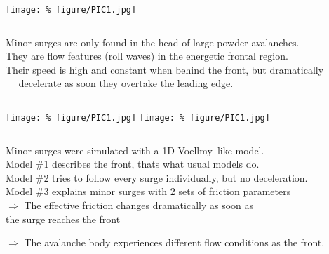 \documentclass[unknownkeysallowed,usepdftitle=false]{beamer}
\newcommand{\secvariable}{nothing}
\newcommand{\mysection}[1]{\renewcommand{\secvariable}{#1}
}
\begin{document}
\mysection{minor}
\begin{frame}\label{\secvariable} %
\begin{center}
\texttt{[image: \%
figure/PIC1.jpg]}
\end{center}
\vspace{-0.2cm}
\begin{columns}
\begin{column}[t]{1.1\textwidth}
Minor surges are only found in the head of large powder avalanches.\\
They are flow features (roll waves) in the energetic
frontal region.\\
Their speed is high and constant when behind the front, but dramatically \\
$\quad$ decelerate as soon they overtake the leading edge.

\end{column}
\end{columns}

\end{frame}

\mysection{friction}
\begin{frame}\label{\secvariable}
\hspace{-0.6cm}
\texttt{[image: \%
figure/PIC1.jpg]}
\texttt{[image: \%
figure/PIC1.jpg]}

\begin{columns}
\begin{column}[t]{1.1\textwidth}
Minor surges were simulated with a 1D Voellmy--like model.\\
Model \#1 describes the front, thats what usual models do.\\
Model \#2 tries to follow every surge individually, but no deceleration.\\
Model \#3 explains minor surges with 2 sets of friction
parameters\\
\vspace{0.2cm}
$\Rightarrow$ The effective friction changes dramatically as soon as\\
\raggedleft the surge reaches the front\\
\raggedright $\Rightarrow$ The avalanche body experiences different flow
conditions as the front.
\end{column}
\end{columns}

\end{frame}
\end{document}
